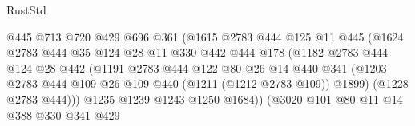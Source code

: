 \begin{lexlean}{RustStd}
\begin{coremodule}
{\begin{coremodule}
{{{{{{{{                                @445
                                @713
                                @720
                                @429
                                @696
                                @361
                                (@1615
                                  @2783
                                  @444
                                  @125
                                  @11
                                  @445
                                  (@1624
                                    @2783
                                    @444
                                    @35
                                    @124
                                    @28
                                    @11
                                    @330
                                    @442
                                    @444
                                    @178
                                    (@1182
                                      @2783
                                      @444
                                      @124
                                      @28
                                      @442
                                      (@1191
                                        @2783
                                        @444
                                        @122
                                        @80
                                        @26
                                        @14
                                        @440
                                        @341
                                        (@1203
                                          @2783
                                          @444
                                          @109
                                          @26
                                          @109
                                          @440
                                          (@1211 (@1212 @2783 @109))
                                          @1899)
                                        (@1228 @2783 @444)))
                                    @1235
                                    @1239
                                    @1243
                                    @1250
                                    @1684))
                                (@3020
                                  @101
                                  @80
                                  @11
                                  @14
                                  @388
                                  @330
                                  @341
                                  @429
}}}}}}}}
\end{coremodule}}
\end{coremodule}
\end{lexlean}
